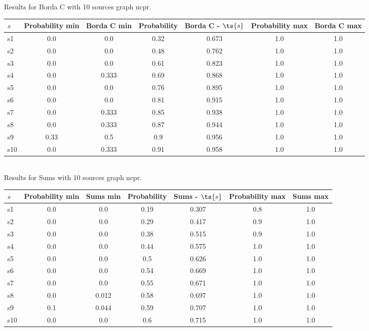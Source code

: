 \documentclass{article}
\begin{document}
\noindent Results for Borda C with 10 sources graph ncpr.

\noindent\begin{tabular}{|l|c|c|c|c|c|c|}
\hline
$s$& Probability min & Borda C min & Probability & Borda C - $\ts{s}$ & Probability max & Borda C max\\
\hline
s1 &0.0 & 0.0 & 0.32 & 0.673 & 1.0 & 1.0\\
\hline
s2 &0.0 & 0.0 & 0.48 & 0.762 & 1.0 & 1.0\\
\hline
s3 &0.0 & 0.0 & 0.61 & 0.823 & 1.0 & 1.0\\
\hline
s4 &0.0 & 0.333 & 0.69 & 0.868 & 1.0 & 1.0\\
\hline
s5 &0.0 & 0.0 & 0.76 & 0.895 & 1.0 & 1.0\\
\hline
s6 &0.0 & 0.0 & 0.81 & 0.915 & 1.0 & 1.0\\
\hline
s7 &0.0 & 0.333 & 0.85 & 0.938 & 1.0 & 1.0\\
\hline
s8 &0.0 & 0.333 & 0.87 & 0.944 & 1.0 & 1.0\\
\hline
s9 &0.33 & 0.5 & 0.9 & 0.956 & 1.0 & 1.0\\
\hline
s10 &0.0 & 0.333 & 0.91 & 0.958 & 1.0 & 1.0\\
\hline
\end{tabular}\\

\noindent Results for Sums with 10 sources graph ncpr.

\noindent\begin{tabular}{|l|c|c|c|c|c|c|}
\hline
$s$& Probability min & Sums min & Probability & Sums - $\ts{s}$ & Probability max & Sums max\\
\hline
s1 &0.0 & 0.0 & 0.19 & 0.307 & 0.8 & 1.0\\
\hline
s2 &0.0 & 0.0 & 0.29 & 0.417 & 0.9 & 1.0\\
\hline
s3 &0.0 & 0.0 & 0.38 & 0.515 & 0.9 & 1.0\\
\hline
s4 &0.0 & 0.0 & 0.44 & 0.575 & 1.0 & 1.0\\
\hline
s5 &0.0 & 0.0 & 0.5 & 0.626 & 1.0 & 1.0\\
\hline
s6 &0.0 & 0.0 & 0.54 & 0.669 & 1.0 & 1.0\\
\hline
s7 &0.0 & 0.0 & 0.55 & 0.671 & 1.0 & 1.0\\
\hline
s8 &0.0 & 0.012 & 0.58 & 0.697 & 1.0 & 1.0\\
\hline
s9 &0.1 & 0.044 & 0.59 & 0.707 & 1.0 & 1.0\\
\hline
s10 &0.0 & 0.0 & 0.6 & 0.715 & 1.0 & 1.0\\
\hline
\end{tabular}\\
\end{document}
